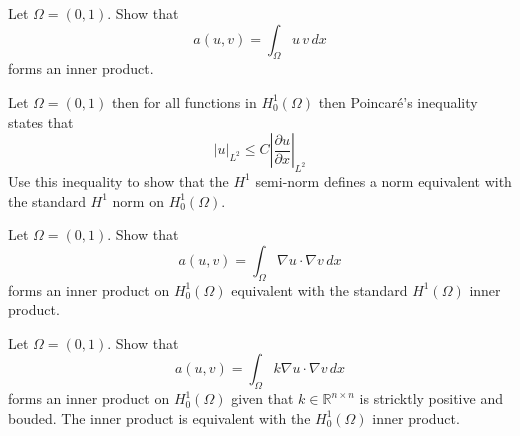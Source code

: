 \begin{exercise}
\label{ex:inner}
Let $\Omega=(0,1)$.  
Show that 
\[  
a(u, v) = \int_\Omega  u \, v \, dx 
\]
forms an inner product.  
\end{exercise}




\begin{exercise}
\label{ex:poincare}

Let $\Omega=(0,1)$ then  
for all functions in $H^1_0(\Omega)$ then
Poincar\'e's inequality states that
\[
|u|_{L^2} \le C  |\frac{\partial u}{\partial x}|_{L^2}   
\]
Use this inequality to show that the $H^1$ semi-norm defines 
a norm equivalent with the standard $H^1$ norm on $H^1_0(\Omega)$.  
\end{exercise}



\begin{exercise}
\label{ex:poincare2}

Let $\Omega=(0,1)$.  
Show that 
\[  
a(u, v) = \int_\Omega \nabla u \cdot \nabla v \, dx 
\]
forms an inner product on $H^1_0(\Omega)$  equivalent with the standard
$H^1(\Omega)$ inner product. 
\end{exercise}

\begin{exercise}
\label{ex:poincare3}

Let $\Omega=(0,1)$.  
Show that 
\[  
a(u, v) = \int_\Omega k \nabla u \cdot \nabla v \, dx 
\]
forms an inner product on $H^1_0(\Omega)$ given that $k \in \mathbb{R}^{n \times n}$ is stricktly positive
and bouded. The inner product is equivalent with the $H^1_0(\Omega)$ inner product.  


\end{exercise}



